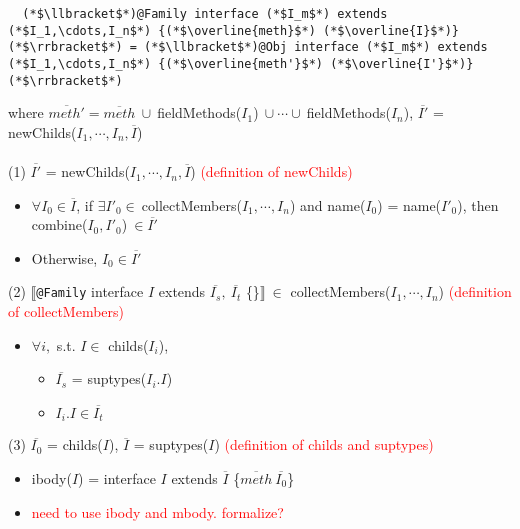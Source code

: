 \begin{figure*}
\begin{lstlisting}
  (*$\llbracket$*)@Family interface (*$I_m$*) extends (*$I_1,\cdots,I_n$*) {(*$\overline{meth}$*) (*$\overline{I}$*)}(*$\rrbracket$*) = (*$\llbracket$*)@Obj interface (*$I_m$*) extends (*$I_1,\cdots,I_n$*) {(*$\overline{meth'}$*) (*$\overline{I'}$*)}(*$\rrbracket$*)
\end{lstlisting}
\hspace{.3in}where $\overline{meth'}=\overline{meth}\ \cup\ $\textsf{fieldMethods(}$I_1$\textsf{)}$\ \cup\cdots\cup\ $\textsf{fieldMethods(}$I_n$\textsf{)}, $\overline{I'}$ = \textsf{newChilds(}$I_1,\cdots,I_n,\overline{I}$\textsf{)}
~\\~\\
(1) $\overline{I'}$ = \textsf{newChilds(}$I_1,\cdots,I_n,\overline{I}$\textsf{)} \textcolor{red}{(definition of newChilds)}
    \begin{itemize}
    \item $\forall I_0\in\overline{I}$, if $\exists I'_0\in\ $\textsf{collectMembers(}$I_1,\cdots,I_n$\textsf{)} and \textsf{name(}$I_0$\textsf{)} = \textsf{name(}$I'_0$\textsf{)}, then \textsf{combine(}$I_0,I'_0$\textsf{)}$\ \in\overline{I'}$
    \item Otherwise, $I_0\in\overline{I'}$
    \end{itemize}
(2) $\llbracket$\lstinline{@Family}\textsf{ interface }$I$\textsf{ extends }$\overline{I_s},\ \overline{I_t}$\textsf{ \{\}}$\rrbracket\ \in$ \textsf{collectMembers(}$I_1,\cdots,I_n$\textsf{)} \textcolor{red}{(definition of collectMembers)}
    \begin{itemize}
    \item $\forall i,$ s.t. $I\in$\textsf{ childs(}$I_i$\textsf{)},
        \begin{itemize}
        \item $\overline{I_s}$ = \textsf{suptypes(}$I_i.I$\textsf{)}
        \item $I_i.I\in\overline{I_t}$
        \end{itemize}
    \end{itemize}
(3) $\overline{I_0}$ = \textsf{childs(}$I$\textsf{)}, $\overline{I}$ = \textsf{suptypes(}$I$\textsf{)} \textcolor{red}{(definition of childs and suptypes)}
    \begin{itemize}
    \item \textsf{ibody(}$I$\textsf{)} = \textsf{interface }$I$\textsf{ extends }$\overline{I}$\textsf{ \{}$\overline{meth}\ \overline{I_0}$\textsf{\}}
    \item \textcolor{red}{need to use ibody and mbody. formalize?}

\end{itemize}
\end{figure*}
